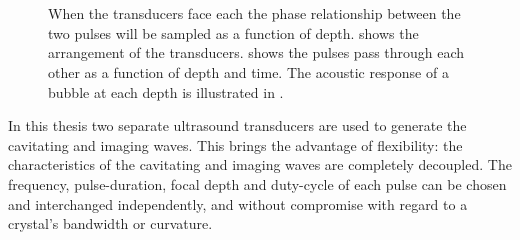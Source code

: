 


\begin{figure}[h]
     \centering
     \\
     \\
     \caption{
       When the transducers face each the phase relationship between the two pulses will be sampled as a function of depth.
        shows the arrangement of the transducers.
        shows the pulses pass through each other as a function of depth and time.
       The acoustic response of a bubble at each depth is illustrated in .
     }
     \label{fig:pressure_pulses}
\end{figure}

In this thesis two separate ultrasound transducers are used to generate the cavitating and imaging waves.
This brings the advantage of flexibility:
the characteristics of the cavitating and imaging waves are completely decoupled.
The  frequency, pulse-duration, focal depth and duty-cycle of each pulse can be chosen and interchanged independently,
and without  compromise with regard to a crystal's bandwidth or curvature.

